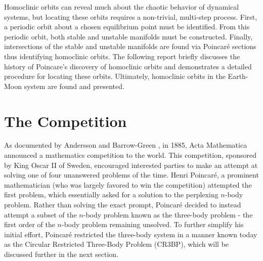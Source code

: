 \documentclass[11pt]{article} %
\begin{document}
Homoclinic orbits can reveal much about the chaotic behavior of dynamical systems, but locating these orbits requires a non-trivial, multi-step process. First, a periodic orbit about a chosen equilibrium point must be identified. From this periodic orbit, both stable and unstable manifolds must be constructed. Finally, intersections of the stable and unstable manifolds are found via Poincaré sections thus identifying homoclinic orbits. The following report briefly discusses the history of Poincare's discovery of homoclinic orbits and demonstrates a detailed procedure for locating these orbits. Ultimately, homoclinic orbits in the Earth-Moon system are found and presented.

\section{The Competition}
As documented by Andersson and Barrow-Green \cite{Andersson1994,BarrowGreen1994}, in 1885, Acta Mathematica announced a mathematics competition to the world. This competition, sponsored by King Oscar II of Sweden, encouraged interested parties to make an attempt at solving one of four unanswered problems of the time. Henri Poincaré, a prominent mathematician (who was largely favored to win the competition) attempted the first problem, which essentially asked for a solution to the perplexing $n$-body problem. Rather than solving the exact prompt, Poincaré decided to instead attempt a subset of the $n$-body problem known as the three-body problem - the first order of the $n$-body problem remaining unsolved. To further simplify his initial effort, Poincaré restricted the three-body system in a manner known today as the Circular Restricted Three-Body Problem (CR3BP), which will be discussed further in the next section.
\end{document}

